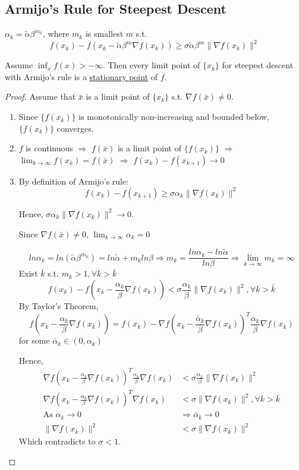 \documentclass[11pt]{elegantbook}
\begin{document}
\subsection{Armijo's Rule for Steepest Descent}
$\alpha_k=\tilde{\alpha}\beta^{m_k}$, where $m_k$ is smallest $m$ s.t. $$f(x_k)-f(x_k-\tilde{\alpha}\beta^{m} \nabla f(x_k))\geq \sigma\tilde{\alpha}\beta^{m}\|\nabla f(x_k)\|^2$$

\begin{proposition}
Assume $\inf_x f(x)>-\infty$. Then every limit point of $\{x_k\}$ for steepest descent with Armijo's rule is a \underline{stationary point} of $f$.
\end{proposition}
\begin{proof}
Assume that $\bar{x}$ is a limit point of $\{x_k\}$ s.t. $\nabla f(\bar{x})\neq 0$.
\begin{enumerate}[$\bullet$]
    \item Since $\{f(x_k)\}$ is monotonically non-increasing and bounded below, $\{f(x_k)\}$ converges.
    \item $f$ is continuous $\Rightarrow$ $f(\bar{x})$ is a limit point of $\{f(x_k)\}$ $\Rightarrow$ $\lim_{k \rightarrow \infty}f(x_k)=f(\bar{x})$ $\Rightarrow$ $f(x_k)-f(x_{k+1})\rightarrow 0$
    \item By definition of Armijo's rule: $$f(x_k)-f(x_{k+1})\geq \sigma\alpha_k\|\nabla f(x_k)\|^2$$
    
    Hence, $\sigma\alpha_k\|\nabla f(x_k)\|^2 \rightarrow 0$.

    Since $\nabla f(\bar{x})\neq 0$, $\lim_{k \rightarrow \infty}\alpha_k=0$

    $$ln\alpha_k=ln (\tilde{\alpha}\beta^{m_k})=ln\tilde{\alpha}+m_kln\beta \Rightarrow	m_k=\frac{ln\alpha_k-ln\tilde{\alpha}}{ln\beta}\Rightarrow \lim_{k \rightarrow \infty}m_k=\infty$$
    Exist $\bar{k}$ s.t. $m_k>1,\forall k>\bar{k}$
    $$f(x_k)-f(x_k-\frac{\alpha_k}{\beta}\nabla f(x_k))<\sigma\frac{\alpha_k}{\beta}\|\nabla f(x_k)\|^2,\forall k>\bar{k}$$
    By Taylor's Theorem,
    $$f(x_k-\frac{\alpha_k}{\beta}\nabla f(x_k))=f(x_k)-\nabla f(x_k-\frac{\bar{\alpha}_k}{\beta}\nabla f(x_k))^T\frac{\alpha_k}{\beta}\nabla f(x_k)$$ for some $\bar{\alpha}_k\in(0,\alpha_k)$

    Hence, \begin{equation}
        \begin{aligned}
            \nabla f(x_k-\frac{\bar{\alpha}_k}{\beta}\nabla f(x_k))^T\frac{\alpha_k}{\beta}\nabla f(x_k)&<\sigma\frac{\alpha_k}{\beta}\|\nabla f(x_k)\|^2\\
            \nabla f(x_k-\frac{\bar{\alpha}_k}{\beta}\nabla f(x_k))^T\nabla f(x_k)&<\sigma\|\nabla f(x_k)\|^2,
            \forall k>\bar{k}\\
            \text{As }\alpha_k \rightarrow 0& \Rightarrow \bar{\alpha}_k\rightarrow 0\\
            \|\nabla f(x_k)\|^2&<\sigma\|\nabla f(x_k)\|^2
        \end{aligned}
        \nonumber
    \end{equation}
    Which contradicts to $\sigma<1$.
\end{enumerate}
\end{proof}
\end{document}
